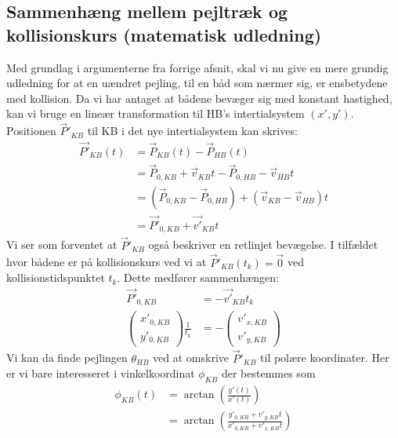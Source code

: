 \documentclass[%
 reprint,
nofootinbib,
aps,
]{revtex4-1}
\begin{document}
\subsection{Sammenhæng mellem pejltræk og kollisionskurs (matematisk udledning)}\label{sec:pejling_betydning}
Med grundlag i argumenterne fra forrige afsnit, skal vi nu give en mere grundig udledning for at en uændret pejling, til en båd som nærmer sig, er ensbetydene med kollision. Da vi har antaget at bådene bevæger sig med konstant hastighed, kan vi bruge en lineær transformation til HB's intertialsystem $(x',y')$. Positionen $\vec{P}'_{KB}$ til KB i det nye intertialsystem kan skrives:
\begin{align*}
  \vec{P'}_{KB}(t) &= \vec{P}_{KB}(t) - \vec{P}_{HB}(t) \\
  &= \vec{P}_{0,KB} + \vec{v}_{KB}t - \vec{P}_{0,HB} - \vec{v}_{HB}t \\
  &= (\vec{P}_{0,KB} - \vec{P}_{0,HB}) + (\vec{v}_{KB} - \vec{v}_{HB})t \\
  &= \vec{P'}_{0,KB} + \vec{v'}_{KB}t
\end{align*}
Vi ser som forventet at $\vec{P}'_{KB}$ også beskriver en retlinjet bevægelse. I tilfældet hvor bådene er på kollisionskurs ved vi at $\vec{P}'_{KB}(t_k) = \vec{0}$ ved kollisionstidspunktet $t_{k}$. Dette medfører sammenhængen:
\begin{align}
  \vec{P'}_{0,KB} &= - \vec{v'}_{KB}t_k \nonumber \\
  \begin{pmatrix} x'_{0,KB} \\ y'_{0,KB} \end{pmatrix}\frac{1}{t_k} &=   -\begin{pmatrix} v'_{x,KB} \\ v'_{y,KB} \end{pmatrix}
  \label{eq:P=v}
\end{align}
Vi kan da finde pejlingen $\theta_{HB}$ ved at omskrive $\vec{P}'_{KB}$ til polære koordinater. Her er vi bare interesseret i vinkelkoordinat $\phi_{KB}$ der bestemmes som
\begin{align*}
  \phi_{KB}(t) &= \arctan{\left( \frac{y'(t)}{x'(t)}\right)} \\
  &= \arctan{\left( \frac{y'_{0,KB} + v'_{y,KB}t}{x'_{0,KB} + v'_{x,KB}t}\right)}
\end{align*}
\end{document}
